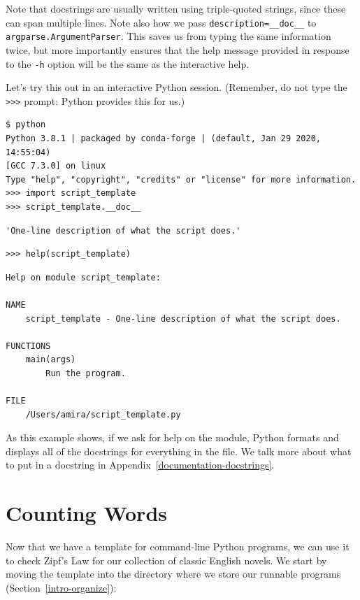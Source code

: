 \documentclass[
]{krantz}
\begin{document}
Note that docstrings are usually written using triple-quoted strings,
since these can span multiple lines.
Note also how we pass \texttt{description=\_\_doc\_\_} to \texttt{argparse.ArgumentParser}.
This saves us from typing the same information twice,
but more importantly ensures that
the help message provided in response to the \texttt{-h} option
will be the same as the interactive help.

Let's try this out in an interactive Python session.
(Remember, do not type the \texttt{\textgreater{}\textgreater{}\textgreater{}} prompt:
Python provides this for us.)

\begin{verbatim}
$ python
Python 3.8.1 | packaged by conda-forge | (default, Jan 29 2020, 14:55:04)
[GCC 7.3.0] on linux
Type "help", "copyright", "credits" or "license" for more information.
>>> import script_template
>>> script_template.__doc__
\end{verbatim}

\begin{verbatim}
'One-line description of what the script does.'
\end{verbatim}

\begin{verbatim}
>>> help(script_template)
\end{verbatim}

\begin{verbatim}
Help on module script_template:

NAME
    script_template - One-line description of what the script does.

FUNCTIONS
    main(args)
        Run the program.

FILE
    /Users/amira/script_template.py
\end{verbatim}

As this example shows,
if we ask for help on the module,
Python formats and displays all of the docstrings for everything in the file.
We talk more about what to put in a docstring in Appendix~\ref{documentation-docstrings}.

\hypertarget{scripting-wordcount}{%
\section{Counting Words}\label{scripting-wordcount}}

Now that we have a template for command-line Python programs,
we can use it to check Zipf's Law for our collection of classic English novels.
We start by moving the template into the directory
where we store our runnable programs (Section~\ref{intro-organize}):
\end{document}
